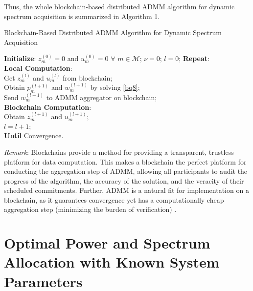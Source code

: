 \documentclass[journal]{IEEEtran}
\begin{document}
Thus, the whole blockchain-based distributed ADMM algorithm for dynamic spectrum acquisition is summarized in Algorithm 1.

\begin{algorithm}[h]
\caption{Blockchain-Based Distributed ADMM Algorithm for Dynamic Spectrum Acquisition}
\begin{algorithmic}[1]
\STATE \textbf{Initialize}: $z_m^{(0)}=0$ and $u_m^{(0)}=0$ $\forall$ $m\in\mathcal{M}$; $\nu=0$; $l=0$;
\STATE \textbf{Repeat}: \\
\hspace{0.5cm} \textbf{Local Computation}:\\
\hspace{1.0cm} Get $z_m^{(l)}$ and $u_m^{(l)}$ from blockchain;\\
\hspace{1.0cm} Obtain $p_m^{(l+1)}$ and $w_m^{(l+1)}$ by solving \eqref{bq8}; \\
\hspace{1.0cm} Send $w_m^{(l+1)}$ to ADMM aggregator on blockchain;\\
\hspace{0.5cm} \textbf{Blockchain Computation}:\\
\hspace{1.0cm} Obtain $z_m^{(l+1)}$ and $u_m^{(l+1)}$; \\
\hspace{0.5cm} $l=l+1$;\\
\textbf{Until} Convergence.\\
\end{algorithmic}
\end{algorithm}

\emph{Remark}: Blockchains provide a method for providing a transparent, trustless platform for data computation. This makes a blockchain the perfect platform for conducting the aggregation step of ADMM, allowing all participants to audit the progress of the algorithm, the accuracy of the solution, and the veracity of their scheduled commitments. Further, ADMM is a natural fit for implementation on a blockchain, as it guarantees
convergence yet has a computationally cheap aggregation step (minimizing the burden of verification) \cite{Munsing}.

\section{Optimal Power and Spectrum Allocation with Known System Parameters}
\end{document}
